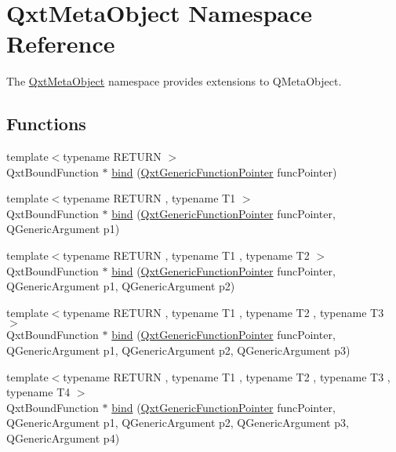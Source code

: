 \hypertarget{namespace_qxt_meta_object}{\section{Qxt\-Meta\-Object Namespace Reference}
\label{namespace_qxt_meta_object}
}


The \hyperlink{namespace_qxt_meta_object}{Qxt\-Meta\-Object} namespace provides extensions to Q\-Meta\-Object.  


\subsection*{Functions}
\begin{DoxyCompactItemize}
\item 
{\footnotesize template$<$typename R\-E\-T\-U\-R\-N $>$ }\\Qxt\-Bound\-Function $\ast$ \hyperlink{namespace_qxt_meta_object_a2b6bbc7dee3039f1397174d1bc2c60c5}{bind} (\hyperlink{class_qxt_generic_function_pointer}{Qxt\-Generic\-Function\-Pointer} func\-Pointer)
\item 
{\footnotesize template$<$typename R\-E\-T\-U\-R\-N , typename T1 $>$ }\\Qxt\-Bound\-Function $\ast$ \hyperlink{namespace_qxt_meta_object_ac88f93442cc6ff4d62c0f38330924ea7}{bind} (\hyperlink{class_qxt_generic_function_pointer}{Qxt\-Generic\-Function\-Pointer} func\-Pointer, Q\-Generic\-Argument p1)
\item 
{\footnotesize template$<$typename R\-E\-T\-U\-R\-N , typename T1 , typename T2 $>$ }\\Qxt\-Bound\-Function $\ast$ \hyperlink{namespace_qxt_meta_object_af8d243ee71b041028a9b59b629ebbc2d}{bind} (\hyperlink{class_qxt_generic_function_pointer}{Qxt\-Generic\-Function\-Pointer} func\-Pointer, Q\-Generic\-Argument p1, Q\-Generic\-Argument p2)
\item 
{\footnotesize template$<$typename R\-E\-T\-U\-R\-N , typename T1 , typename T2 , typename T3 $>$ }\\Qxt\-Bound\-Function $\ast$ \hyperlink{namespace_qxt_meta_object_a8982642ca67f45f8b078cffa8bd5b39f}{bind} (\hyperlink{class_qxt_generic_function_pointer}{Qxt\-Generic\-Function\-Pointer} func\-Pointer, Q\-Generic\-Argument p1, Q\-Generic\-Argument p2, Q\-Generic\-Argument p3)
\item 
{\footnotesize template$<$typename R\-E\-T\-U\-R\-N , typename T1 , typename T2 , typename T3 , typename T4 $>$ }\\Qxt\-Bound\-Function $\ast$ \hyperlink{namespace_qxt_meta_object_a8ff2382ae39c022b34b16b6fd8bf477e}{bind} (\hyperlink{class_qxt_generic_function_pointer}{Qxt\-Generic\-Function\-Pointer} func\-Pointer, Q\-Generic\-Argument p1, Q\-Generic\-Argument p2, Q\-Generic\-Argument p3, Q\-Generic\-Argument p4)

\end{DoxyCompactItemize}
